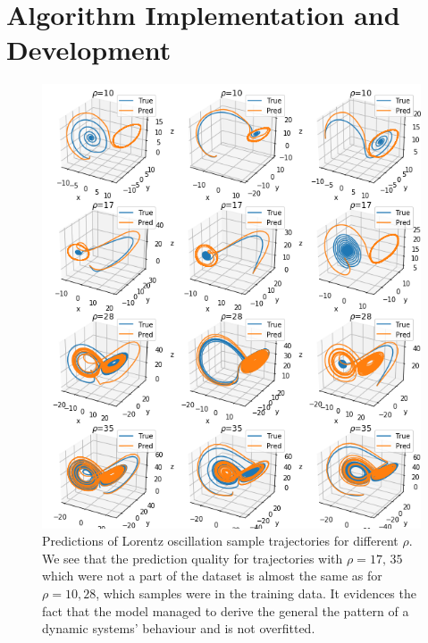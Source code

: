 \documentclass{article}
\begin{document}
\section{Algorithm Implementation and Development}

\begin{figure}
    \centering
    \includegraphics[width=\textwidth]{images/lorentz_trajectories}
    \caption{\label{fig:lorentz_trajectories} Predictions of Lorentz oscillation sample trajectories for different $\rho$. We see that the prediction quality for trajectories with $\rho = 17,\, 35$ which were not a part of the dataset is almost the same as for $\rho = 10, 28$, which samples were in the training data. It evidences the fact that the model managed to derive the general the pattern of a dynamic systems' behaviour and is not overfitted. }
\end{figure}
\end{document}
